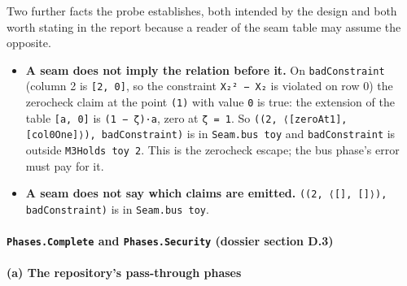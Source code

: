 Two further facts the probe establishes, both intended by the design and both worth stating in the report because a reader of the seam table may assume the opposite.

\begin{itemize}
\item \textbf{A seam does not imply the relation before it.} On \texttt{badConstraint} (column 2 is \texttt{[2,\allowbreak{} 0]}, so the constraint \texttt{X₂² − X₂} is violated on row 0) the zerocheck claim at the point \texttt{(\allowbreak{}1)} with value \texttt{0} is true: the extension of the table \texttt{[a,\allowbreak{} 0]} is \texttt{(\allowbreak{}1 − ζ)·a}, zero at \texttt{ζ = 1}. So \texttt{(\allowbreak{}(\allowbreak{}2\allowbreak{},\allowbreak{} ⟨\allowbreak{}[\allowbreak{}z\allowbreak{}e\allowbreak{}r\allowbreak{}o\allowbreak{}A\allowbreak{}t\allowbreak{}1\allowbreak{}]\allowbreak{},\allowbreak{} [\allowbreak{}c\allowbreak{}o\allowbreak{}l\allowbreak{}0\allowbreak{}O\allowbreak{}n\allowbreak{}e\allowbreak{}]\allowbreak{}⟩\allowbreak{})\allowbreak{},\allowbreak{} b\allowbreak{}a\allowbreak{}d\allowbreak{}C\allowbreak{}o\allowbreak{}n\allowbreak{}s\allowbreak{}t\allowbreak{}r\allowbreak{}a\allowbreak{}i\allowbreak{}n\allowbreak{}t\allowbreak{})} is in \texttt{Seam.\allowbreak{}bus toy} and \texttt{badConstraint} is outside \texttt{M3Holds toy 2}. This is the zerocheck escape; the bus phase's error must pay for it.
\item \textbf{A seam does not say which claims are emitted.} \texttt{(\allowbreak{}(\allowbreak{}2\allowbreak{},\allowbreak{} ⟨\allowbreak{}[\allowbreak{}]\allowbreak{},\allowbreak{} [\allowbreak{}]\allowbreak{}⟩\allowbreak{})\allowbreak{},\allowbreak{} b\allowbreak{}a\allowbreak{}d\allowbreak{}C\allowbreak{}o\allowbreak{}n\allowbreak{}s\allowbreak{}t\allowbreak{}r\allowbreak{}a\allowbreak{}i\allowbreak{}n\allowbreak{}t\allowbreak{})} is in \texttt{Seam.\allowbreak{}bus toy}.
\end{itemize}

\paragraph{\texttt{Phases.\allowbreak{}Complete} and \texttt{Phases.\allowbreak{}Security} (dossier section D.3)}\label{sec:gen-spine-D3}

\paragraph{(a) The repository's pass-through phases}

